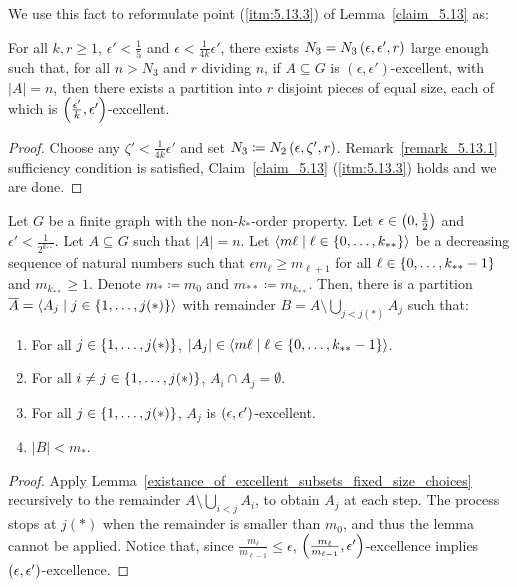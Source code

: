     We use this fact to reformulate point (\ref{itm:5.13.3}) of Lemma~\ref{claim_5.13} as:

    \lemma[Claim 5.13.2(3)]\label{existance_of_equitable_excellent_subpartition}
        For all $k, r \geq 1$, $\epsilon' < \frac{1}{5}$ and $\epsilon < \frac{1}{4k} \epsilon'$, there exists
        $N_3 = N_3\left( \epsilon, \epsilon', r \right)$ large enough such that, for all $n > N_3$ and $r$ dividing $n$,
        if $A \subseteq G$ is $\left( \epsilon, \epsilon' \right)$-excellent, with $|A| = n$, then there exists a
        partition into $r$ disjoint pieces of equal size, each of which is $\left( \frac{\epsilon'}{k}, \epsilon' \right)$-excellent.
        \begin{proof}
            Choose any $\zeta' < \frac{1}{4k} \epsilon'$ and set $N_3 \coloneq N_2\left( \epsilon, \zeta', r \right)$.
            Remark~\ref{remark_5.13.1} sufficiency condition is satisfied, Claim~\ref{claim_5.13} (\ref{itm:5.13.3}) holds
            and we are done.
        \end{proof}

    \lemma[Claim 5.14.1]\label{existance_of_excellent_partition}
        Let $G$ be a finite graph with the non-$k_{*}$-order property.
        Let $\epsilon \in \left( 0, \frac{1}{2} \right)$ and $\epsilon' < \frac{1}{2^{k_{**}}}$.
        Let $A \subseteq G$ such that $|A| = n$.
        Let $\left< m\ell \mid \ell \in \left\{ 0, \dots, k_{**} \right\} \right>$ be a decreasing sequence of natural numbers such that
        $\epsilon m_{\ell} \geq m_{\ell+1}$ for all $\ell \in \left\{ 0, \dots, k_{**}-1 \right\}$ and $m_{k_{**}} \geq 1$.
        Denote $m_* \coloneq m_0$ and $m_{**} \coloneq m_{k_{**}}$.
        Then, there is a partition $\overline{A} = \left< A_j \mid j \in \left\{ 1, \dots, j(*) \right\} \right>$ with remainder
        $B = A \setminus \bigcup_{j < j(*)} A_j$ such that:
        \begin{enumerate}[label=(\alph*), ref=\alph*]
            \item \label{itm:5.14.1.a} For all $j \in \left\{ 1, \dots, j(*) \right\}$, $|A_j| \in \left< m\ell \mid \ell \in \left\{ 0, \dots, k_{**}-1 \right\} \right>$.
            \item \label{itm:5.14.1.b} For all $i \neq j \in \left\{ 1, \dots, j(*) \right\}$, $A_i \cap A_j = \emptyset$.
            \item \label{itm:5.14.1.c} For all $j \in \left\{ 1, \dots, j(*) \right\}$, $A_j$ is $\left( \epsilon, \epsilon' \right)$-excellent.
            \item \label{itm:5.14.1.d} $|B| < m_*$.
        \end{enumerate}
        \begin{proof}
            Apply Lemma~\ref{existance_of_excellent_subsets_fixed_size_choices} recursively to the remainder
            $A \setminus \bigcup_{i < j} A_i$, to obtain $A_j$ at each step.
            The process stops at $j(*)$ when the remainder is smaller than $m_0$, and thus the lemma cannot be applied.
            Notice that, since $\frac{m_\ell}{m_{\ell-1}} \leq \epsilon$, $\left( \frac{m_\ell}{m_{\ell-1}}, \epsilon' \right)$-excellence
            implies $\left( \epsilon, \epsilon' \right)$-excellence.
        \end{proof}

